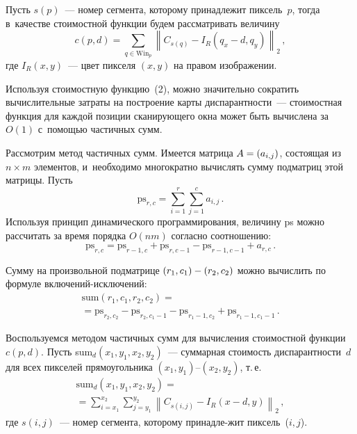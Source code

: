 \begin{multicols}{2}
  Пусть $s(p)$~--- номер сегмента, которому принадлежит пиксель~$p$, тогда 
в~качестве стоимостной функции будем рассматривать величину
  \begin{equation}
  c(p,d) =\sum\limits_{q\in \mathrm{Win}_p} \left\| C_{s(q)} -I_R(q_x-d, q_y)\right\|_{2}\,,
  \label{e2-ya}
  \end{equation}
  где $I_R(x,y)$~--- цвет пикселя $(x,y)$ на правом изображении.
  
Используя стоимостную функцию~(2), можно значительно сократить 
вычислительные затраты на построение карты диспарантности~--- стоимостная 
функция для каждой позиции сканирующего окна может быть вычислена за 
$O(1)$ с~помощью частичных сумм.

  Рассмотрим метод частичных сумм. Имеется матрица $A\hm= (a_{i,j})$, 
состоящая из $n\times m$ элементов, и~необходимо многократно вычислять 
сумму подматриц этой матрицы. Пусть
  $$
  \mathrm{ps}_{r,c} =\sum\limits_{i=1}^r \sum\limits_{j=1}^c a_{i,j}\,.
  $$
Используя принцип динамического программирования, величину ps можно 
рассчитать за время порядка $O(n m)$ согласно соотношению:
\begin{equation}
\mathrm{ps}_{r,c}= \mathrm{ps}_{r-1,c} +\mathrm{ps}_{r,c-1} -
\mathrm{ps}_{r-1,c-1}+a_{r,c}\,.
\label{e3-ya}
\end{equation}
  
  Сумму на произвольной подматрице $(r_1,c_1)\hm- (r_2,c_2)$ можно 
вычислить по формуле вклю\-че\-ний-ис\-клю\-че\-ний:
  \begin{multline}
  \mathrm{sum}\left(r_1,c_1,r_2,c_2\right) = {}\\
  {}=\mathrm{ps}_{r_2, c_2} -\mathrm{ps}_{r_2, c_1-1} - \mathrm{ps}_{r_1-1, 
c_2} + \mathrm{ps}_{r_1-1, c_1-1}\,.
  \label{e4-ya}
  \end{multline}
  
  Воспользуемся методом частичных сумм для вычисления стоимостной 
функции $c(p,d)$. Пусть sum$_d(x_1, y_1, x_2, y_2)$~--- суммарная стоимость 
диспарантности~$d$ для всех пикселей прямоугольника $(x_1,y_1)\mbox{--}(x_2,y_2)$, т.\,е.
 \begin{multline*}
  \mathrm{sum}_d \left( x_1, y_1, x_2, y_2\right) = {}\\
  {}=\sum\limits_{i=x_1}^{x_2} 
\sum\limits_{j=y_1}^{y_2} \left\| C_{s(i,j)} -I_R (x-d,y)\right\|_2\,,
  \end{multline*}
  где $s(i,j)$~--- номер сегмента, которому принадле-\linebreak жит пиксель~($i,j$).
  

\end{multicols}
